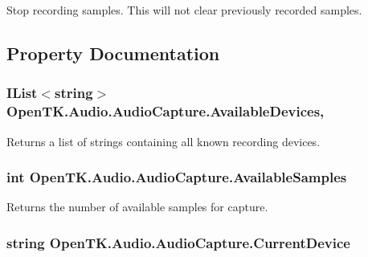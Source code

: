 Stop recording samples. This will not clear previously recorded samples.



\subsection{Property Documentation}
\hypertarget{class_open_t_k_1_1_audio_1_1_audio_capture_ad7c36a085e0c750f4d81f5a3c5eb23d4}{
\subsubsection[{Available\-Devices}]{\setlength{\rightskip}{0pt plus 5cm}I\-List$<$string$>$ Open\-T\-K.\-Audio.\-Audio\-Capture.\-Available\-Devices\hspace{0.3cm}{\ttfamily [static]}, {\ttfamily [get]}}}\label{class_open_t_k_1_1_audio_1_1_audio_capture_ad7c36a085e0c750f4d81f5a3c5eb23d4}


Returns a list of strings containing all known recording devices. 

\hypertarget{class_open_t_k_1_1_audio_1_1_audio_capture_a762b64b2992d6d3f4ba2273bf66fbe41}{
\subsubsection[{Available\-Samples}]{\setlength{\rightskip}{0pt plus 5cm}int Open\-T\-K.\-Audio.\-Audio\-Capture.\-Available\-Samples\hspace{0.3cm}{\ttfamily [get]}}}\label{class_open_t_k_1_1_audio_1_1_audio_capture_a762b64b2992d6d3f4ba2273bf66fbe41}


Returns the number of available samples for capture.

\hypertarget{class_open_t_k_1_1_audio_1_1_audio_capture_ae5998b54c75f78acd25d86c2cdb5e068}{
\subsubsection[{Current\-Device}]{\setlength{\rightskip}{0pt plus 5cm}string Open\-T\-K.\-Audio.\-Audio\-Capture.\-Current\-Device\hspace{0.3cm}{\ttfamily [get]}}}\label{class_open_t_k_1_1_audio_1_1_audio_capture_ae5998b54c75f78acd25d86c2cdb5e068}


